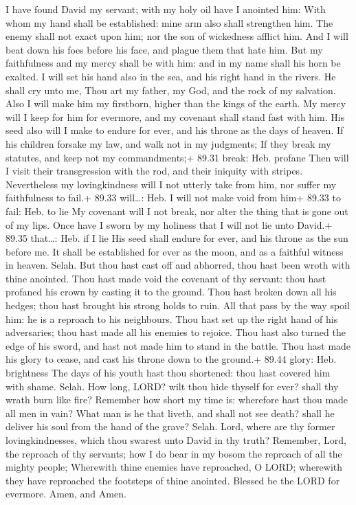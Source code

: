  I have found David my servant; with my holy oil have I
anointed him:  With whom my hand shall be established: mine
arm also shall strengthen him.  The enemy shall not exact
upon him; nor the son of wickedness afflict him.  And I
will beat down his foes before his face, and plague them that hate him.
 But my faithfulness and my mercy shall be with him: and in
my name shall his horn be exalted.  I will set his hand
also in the sea, and his right hand in the rivers.  He
shall cry unto me, Thou art my father, my God, and the rock of my
salvation.  Also I will make him my firstborn, higher than
the kings of the earth.  My mercy will I keep for him for
evermore, and my covenant shall stand fast with him.  His
seed also will I make to endure for ever, and his throne as the days of
heaven.  If his children forsake my law, and walk not in my
judgments;  If they break my statutes, and keep not my
commandments;+ 89.31 break: Heb. profane  Then will I visit
their transgression with the rod, and their iniquity with stripes.
 Nevertheless my lovingkindness will I not utterly take
from him, nor suffer my faithfulness to fail.+ 89.33 will\ldots: Heb. I
will not make void from him+ 89.33 to fail: Heb. to lie  My
covenant will I not break, nor alter the thing that is gone out of my
lips.  Once have I sworn by my holiness that I will not lie
unto David.+ 89.35 that\ldots: Heb. if I lie  His seed
shall endure for ever, and his throne as the sun before me.
 It shall be established for ever as the moon, and as a
faithful witness in heaven. Selah.  But thou hast cast off
and abhorred, thou hast been wroth with thine anointed. 
Thou hast made void the covenant of thy servant: thou hast profaned his
crown by casting it to the ground.  Thou hast broken down
all his hedges; thou hast brought his strong holds to ruin.
 All that pass by the way spoil him: he is a reproach to
his neighbours.  Thou hast set up the right hand of his
adversaries; thou hast made all his enemies to rejoice. 
Thou hast also turned the edge of his sword, and hast not made him to
stand in the battle.  Thou hast made his glory to cease,
and cast his throne down to the ground.+ 89.44 glory: Heb. brightness
 The days of his youth hast thou shortened: thou hast
covered him with shame. Selah.  How long, LORD? wilt thou
hide thyself for ever? shall thy wrath burn like fire? 
Remember how short my time is: wherefore hast thou made all men in vain?
 What man is he that liveth, and shall not see death? shall
he deliver his soul from the hand of the grave? Selah. 
Lord, where are thy former lovingkindnesses, which thou swarest unto
David in thy truth?  Remember, Lord, the reproach of thy
servants; how I do bear in my bosom the reproach of all the mighty
people;  Wherewith thine enemies have reproached, O LORD;
wherewith they have reproached the footsteps of thine anointed.
 Blessed be the LORD for evermore. Amen, and Amen.

